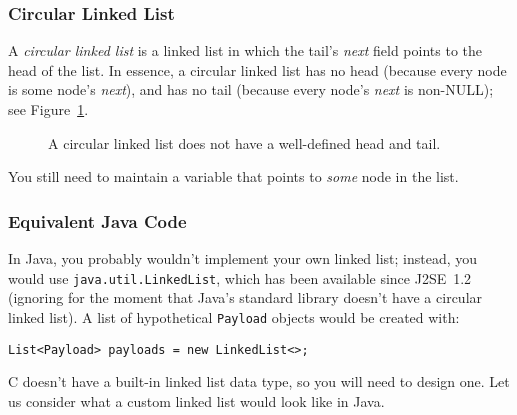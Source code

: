 \subsubsection{Circular Linked List} \label{subsubsec:circularlinkedlist}

A \textit{circular linked list} is a linked list in which the tail's \textit{next} field points to the head of the list.
In essence, a circular linked list has no head (because every node is some node's \textit{next}), and has no tail (because every node's \textit{next} is non-NULL);
see Figure~\ref{fig:circular-linked-list}.

\begin{figure}[h]
    \centering
    \caption{A circular linked list does not have a well-defined head and tail.}\label{fig:circular-linked-list}
\end{figure}

You still need to maintain a variable that points to \textit{some} node in the list.

\subsubsection{Equivalent Java Code}

In Java, you probably wouldn't implement your own linked list;
instead, you would use \lstinline{java.util.LinkedList}, which has been available since J2SE~1.2
(ignoring for the moment that Java's standard library doesn't have a circular linked list).
A list of hypothetical \lstinline{Payload} objects would be created with:
\begin{lstlisting}[numbers=none]
    List<Payload> payloads = new LinkedList<>;
\end{lstlisting}

C doesn't have a built-in linked list data type, so you will need to design one.
Let us consider what a custom linked list would look like in Java.

